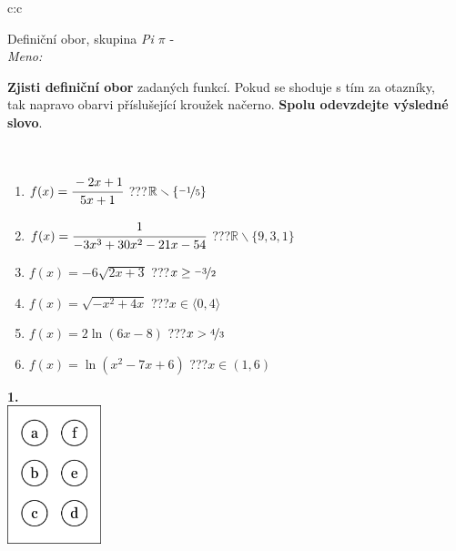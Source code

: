 \documentclass[10pt]{report}
\begin{document}
\begin{tabular}{c:c}
\begin{minipage}[c][104.5mm][t]{0.5\linewidth}
\begin{center}
\vspace{7mm}
{\huge Definiční obor, skupina \textit{Pi $\pi$} -}\\[5mm]
\textit{Meno:}\phantom{xxxxxxxxxxxxxxxxxxxxxxxxxxxxxxxxxxxxxxxxxxxxxxxxxxxxxxxxxxxxxxxxx}\\[5mm]
\begin{minipage}{0.95\linewidth}
\textbf{Zjisti definiční obor} zadaných funkcí. Pokud se shoduje s tím za otazníky,\\tak napravo obarvi příslušející kroužek načerno. \textbf{Spolu odevzdejte výsledné slovo}.
\end{minipage}
\\[1mm]
\begin{minipage}{0.79\linewidth}
\begin{center}
\begin{varwidth}{\linewidth}
\begin{enumerate}
\normalsizerrr
\item $f(x)=\cfrac{-2x+1}{5x+1}$\quad \dotfill\; ???\;\dotfill \quad $\mathbb{R}\smallsetminus\{\nicefrac{-1}{5}\}$
\item $f(x)=\cfrac{1}{-3x^3+30x^2-21x-54}$\quad \dotfill\; ???\;\dotfill \quad $\mathbb{R}\smallsetminus\{9,3,1\}$
\item $f(x)=-6\sqrt{2x+3}$\quad \dotfill\; ???\;\dotfill \quad $x\geq\nicefrac{-3}{2}$
\item $f(x)=\sqrt{-x^2+4x}$\quad \dotfill\; ???\;\dotfill \quad $x\in\langle0 , 4\rangle$
\item $f(x)=2\ln{(6x-8)}$\quad \dotfill\; ???\;\dotfill \quad $x>\nicefrac{4}{3}$
\item $f(x)=\ln{(x^2-7x+6)}$\quad \dotfill\; ???\;\dotfill \quad $x\in(1 , 6)$
\end{enumerate}
\end{varwidth}
\end{center}
\end{minipage}
\begin{minipage}{0.20\linewidth}
\begin{center}
{\Huge\bfseries 1.} \\[2mm]
\includegraphics[height=40mm]{../images/braille.png}

\end{center}
\end{minipage}
\end{center}
\end{minipage}
\end{tabular}
\end{document}
